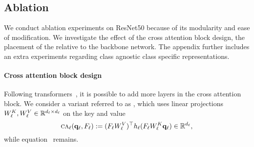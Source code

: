 \subsection{Ablation}
\label{sec:gen_ablation}

We conduct ablation experiments on ResNet50 because of its modularity and ease of modification. We investigate the effect of the cross attention block design, the placement of the \Ours relative to the backbone network.
The appendix further includes an extra experiments regarding class agnostic \vs class specific representations.


\paragraph{Cross attention block design}

Following transformers~\cite{NIPS2017_3f5ee243,dosovitskiy2020image}, it is possible to add more layers in the cross attention block. We consider a variant referred to as \PO, which uses linear projections $W_\ell^K, W_\ell^V \in \mathbb{R}^{d_\ell \times d_\ell}$ on the key and value
\begin{equation}
	{\textsc{ca}}_\ell(\mathbf{q}_\ell, F_\ell) \mathrel{:=} (F_\ell W^V_\ell)^\top h_\ell(F_\ell W^K_\ell \mathbf{q}_\ell)\in \mathbb{R}^{d_\ell},
\label{eq:proj_ca}
\end{equation}
while equation~ remains.

